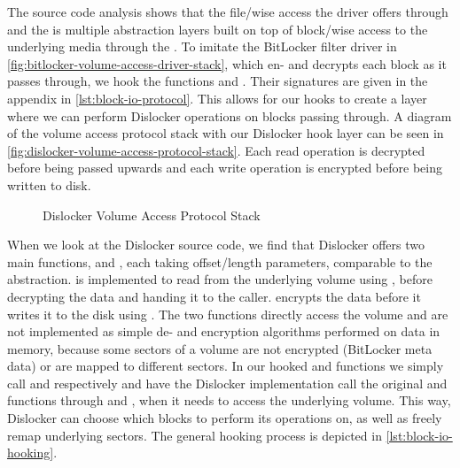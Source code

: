 The source code analysis shows that the file\-/wise access the driver offers through  and the  is multiple abstraction layers built on top of block\-/wise access to the underlying media through the .
To imitate the BitLocker filter driver in \autoref{fig:bitlocker-volume-access-driver-stack}, which en- and decrypts each block as it passes through, we hook the  functions  and . Their signatures are given in the appendix in \autoref{lst:block-io-protocol}.
This allows for our hooks to create a layer where we can perform Dislocker operations on blocks passing through.
A diagram of the volume access protocol stack with our Dislocker hook layer can be seen in \autoref{fig:dislocker-volume-access-protocol-stack}.
Each read operation is decrypted before being passed upwards and each write operation is encrypted before being written to disk.

\begin{figure}[htb]%
    \centering
    
    \caption{Dislocker Volume Access Protocol Stack}%
    \label{fig:dislocker-volume-access-protocol-stack}%
\end{figure}

When we look at the Dislocker source code, we find that Dislocker offers two main functions,  and , each taking offset\-/length parameters, comparable to the  abstraction.
 is implemented to read from the underlying volume using , before decrypting the data and handing it to the caller.
 encrypts the data before it writes it to the disk using .
The two functions directly access the volume and are not implemented as simple de- and encryption algorithms performed on data in memory, because some sectors of a volume are not encrypted (BitLocker meta data) or are mapped to different sectors.
In our hooked  and  functions we simply call  and  respectively and have the Dislocker implementation call the original  and  functions through  and , when it needs to access the underlying volume.
This way, Dislocker can choose which blocks to perform its operations on, as well as freely remap underlying sectors.
The general hooking process is depicted in \autoref{lst:block-io-hooking}.

